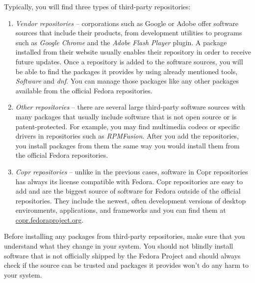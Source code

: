 Typically, you will find three types of third-party repositories:
\begin{enumerate}
\item\emph{Vendor repositories} -- corporations such as Google or Adobe offer software sources that include their products, from development utilities to programs such as \emph{Google Chrome} and the \emph{Adobe Flash Player} plugin. A package installed from their website usually enables their repository in order to receive future updates. Once a repository is added to the software sources, you will be able to find the packages it provides by using already mentioned tools, \emph{Software} and \emph{dnf}. You can manage those packages like any other packages available from the official Fedora repositories.

\item\emph{Other repositories} -- there are several large third-party software sources with many packages that usually include software that is not open source or is patent-protected. For example, you may find multimedia codecs or specific drivers in repositories such as \emph{RPMFusion}. After you add the repositories, you install packages from them the same way you would install them from the official Fedora repositories.

\item\emph{Copr repositories} -- unlike in the previous cases, software in Copr repositories has always its license compatible with Fedora. Copr repositories are easy to add and are the biggest source of software for Fedora outside of the official repositories. They include the newest, often development versions of desktop environments, applications, and frameworks and you can find them at \url{copr.fedoraproject.org}.
\end{enumerate}

Before installing any packages from third-party repositories, make sure that you understand what they change in your system. You should not blindly install software that is not officially shipped by the Fedora Project and should always check if the source can be trusted and packages it provides won't do any harm to your system.

\endinput
